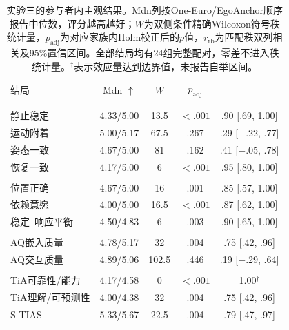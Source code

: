 \begin{table}[t]
\centering
\caption{实验三的参与者内主观结果。Mdn列按One-Euro/EgoAnchor顺序报告中位数，评分越高越好；$W$为双侧条件精确Wilcoxon符号秩统计量，$p_{\mathrm{adj}}$为对应家族内Holm校正后的$p$值，$r_{\mathrm{rb}}$为匹配秩双列相关及95\%置信区间。全部结局均有24组完整配对，零差不进入秩统计量。$^{\dagger}$表示效应量达到边界值，未报告自举区间。}
\label{tab:exp3-subjective}
\setlength{\tabcolsep}{1.8pt}
\renewcommand{\arraystretch}{1.08}
\begin{tabularx}{\columnwidth}{@{}>{\raggedright\arraybackslash}Xcccc@{}}
\toprule
结局 &
Mdn $\uparrow$ &
$W$ &
$p_{\mathrm{adj}}$ &
\shortstack{$r_{\mathrm{rb}}$\\[95\% CI]} \\
\midrule
\multicolumn{5}{@{}l}{\textit{阶段性锚点质量}} \\
静止稳定 & 4.33/5.00 & 13.5 & $<.001$ & .90 [.69, 1.00] \\
运动附着 & 5.00/5.17 & 67.5 & .267 & .29 [$-$.22, .77] \\
姿态一致 & 4.67/5.00 & 81 & .162 & .41 [$-$.05, .78] \\
恢复一致 & 4.17/5.00 & 6 & $<.001$ & .95 [.80, 1.00] \\
\addlinespace[2pt]
\multicolumn{5}{@{}l}{\textit{整体锚定判断}} \\
位置正确 & 4.67/5.00 & 16 & .001 & .85 [.57, 1.00] \\
依赖意愿 & 4.00/5.00 & 16.5 & $<.001$ & .87 [.62, 1.00] \\
稳定--响应平衡 & 4.50/4.83 & 6 & .003 & .90 [.65, 1.00] \\
\addlinespace[2pt]
\multicolumn{5}{@{}l}{\textit{增强质量}} \\
AQ嵌入质量 & 4.78/5.17 & 32 & .004 & .75 [.42, .96] \\
AQ交互质量 & 4.89/5.06 & 102.5 & .446 & .19 [$-$.29, .64] \\
\addlinespace[2pt]
\multicolumn{5}{@{}l}{\textit{信任}} \\
TiA可靠性/能力 & 4.17/4.58 & 0 & $<.001$ & 1.00$^{\dagger}$ \\
TiA理解/可预测性 & 4.00/4.38 & 32 & .004 & .75 [.42, .96] \\
S-TIAS & 5.33/5.67 & 22.5 & .004 & .79 [.47, .97] \\
\bottomrule
\end{tabularx}
\end{table}
